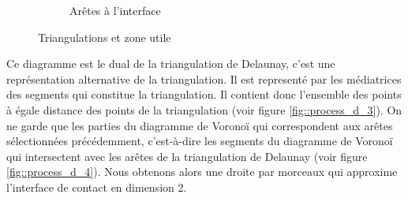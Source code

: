 \begin{figure}[ht]
\begin{subfigure}{0.45\textwidth}
  \caption{Arêtes à l'interface}
  \label{fig::process_d_2}
\end{subfigure}
\caption{Triangulations et zone utile}
\label{fig::delaunays_process_1}
\end{figure}


Ce diagramme est le dual de la triangulation de Delaunay, c'est une représentation alternative
de la triangulation. Il est representé par les
médiatrices des segments qui constitue la triangulation.
 Il contient donc l'ensemble des points à
égale distance des points de la triangulation (voir figure \ref{fig::process_d_3}).
On ne garde que les parties du diagramme de Voronoï qui correspondent aux arêtes sélectionnées
précédemment, c'est-à-dire les segments du diagramme de Voronoï qui intersectent
avec les arêtes de la triangulation de Delaunay (voir figure \ref{fig::process_d_4}).
Nous obtenons alors une droite par morceaux
qui approxime l'interface de contact en dimension 2.

